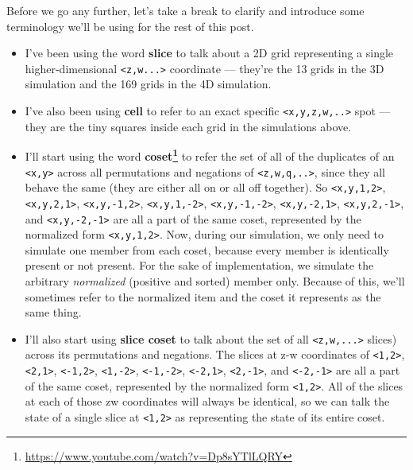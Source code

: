 \documentclass[]{article}
\renewcommand{\href}[2]{#2\footnote{\url{#1}}}
\begin{document}
Before we go any further, let's take a break to clarify and introduce some
terminology we'll be using for the rest of this post.

\begin{itemize}
\item
  I've been using the word \textbf{slice} to talk about a 2D grid representing a
  single higher-dimensional \texttt{\textless{}z,w...\textgreater{}} coordinate
  --- they're the 13 grids in the 3D simulation and the 169 grids in the 4D
  simulation.
\item
  I've also been using \textbf{cell} to refer to an exact specific
  \texttt{\textless{}x,y,z,w,..\textgreater{}} spot --- they are the tiny
  squares inside each grid in the simulations above.
\item
  I'll start using the word
  \textbf{\href{https://www.youtube.com/watch?v=Dp8sYTlLQRY}{coset}} to refer
  the set of all of the duplicates of an \texttt{\textless{}x,y\textgreater{}}
  across all permutations and negations of
  \texttt{\textless{}z,w,q,..\textgreater{}}, since they all behave the same
  (they are either all on or all off together). So
  \texttt{\textless{}x,y,1,2\textgreater{}},
  \texttt{\textless{}x,y,2,1\textgreater{}},
  \texttt{\textless{}x,y,-1,2\textgreater{}},
  \texttt{\textless{}x,y,1,-2\textgreater{}},
  \texttt{\textless{}x,y,-1,-2\textgreater{}},
  \texttt{\textless{}x,y,-2,1\textgreater{}},
  \texttt{\textless{}x,y,2,-1\textgreater{}}, and
  \texttt{\textless{}x,y,-2,-1\textgreater{}} are all a part of the same coset,
  represented by the normalized form \texttt{\textless{}x,y,1,2\textgreater{}}.
  Now, during our simulation, we only need to simulate one member from each
  coset, because every member is identically present or not present. For the
  sake of implementation, we simulate the arbitrary \emph{normalized} (positive
  and sorted) member only. Because of this, we'll sometimes refer to the
  normalized item and the coset it represents as the same thing.
\item
  I'll also start using \textbf{slice coset} to talk about the set of all
  \texttt{\textless{}z,w,...\textgreater{}} slices) across its permutations and
  negations. The slices at z-w coordinates of
  \texttt{\textless{}1,2\textgreater{}}, \texttt{\textless{}2,1\textgreater{}},
  \texttt{\textless{}-1,2\textgreater{}},
  \texttt{\textless{}1,-2\textgreater{}},
  \texttt{\textless{}-1,-2\textgreater{}},
  \texttt{\textless{}-2,1\textgreater{}},
  \texttt{\textless{}2,-1\textgreater{}}, and
  \texttt{\textless{}-2,-1\textgreater{}} are all a part of the same coset,
  represented by the normalized form \texttt{\textless{}1,2\textgreater{}}. All
  of the slices at each of those zw coordinates will always be identical, so we
  can talk the state of a single slice at \texttt{\textless{}1,2\textgreater{}}
  as representing the state of its entire coset.


\end{itemize}
\end{document}

